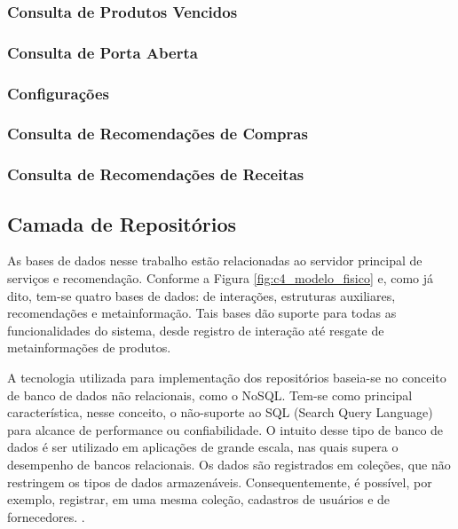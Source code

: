 \subsubsection{Consulta de Produtos Vencidos}

\subsubsection{Consulta de Porta Aberta}

\subsubsection{Configurações}

\subsubsection{Consulta de Recomendações de Compras}

\subsubsection{Consulta de Recomendações de Receitas}


\subsection{Camada de Repositórios}

As bases de dados nesse trabalho estão relacionadas ao servidor principal de serviços e recomendação. Conforme a Figura \ref{fig:c4_modelo_fisico} e, como já dito, tem-se quatro bases de dados: de interações, estruturas auxiliares, recomendações e metainformação. Tais bases dão suporte para todas as funcionalidades do sistema, desde registro de interação até resgate de metainformações de produtos. 

A tecnologia utilizada para implementação dos repositórios baseia-se no conceito de banco de dados não relacionais, como o NoSQL. Tem-se como principal característica, nesse conceito, o não-suporte ao SQL (Search Query Language) para alcance de performance ou confiabilidade. O intuito desse tipo de banco de dados é ser utilizado em aplicações de grande escala, nas quais supera o desempenho de bancos relacionais. Os dados são registrados em coleções, que não restringem os tipos de dados armazenáveis. Consequentemente, é possível, por exemplo, registrar, em uma mesma coleção, cadastros de usuários e de fornecedores. \cite{Boicea2012}. 

